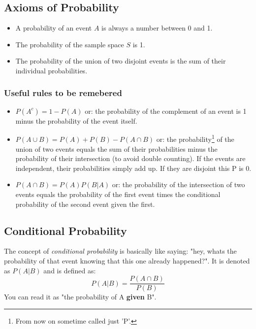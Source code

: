 \documentclass[a4paper]{article}
\begin{document}
\subsection{Axioms of Probability}
\begin{itemize}
    \item A probability of an event \(A\) is always a number between 0 and 1.
    \item The probability of the sample space \(S\) is 1.
    \item The probability of the union of two disjoint events is the sum of their individual probabilities.
\end{itemize}

\subsubsection{Useful rules to be remebered}
\begin{itemize}
    \item \( P(A^c) = 1 - P(A) \) or: the probability of the complement of an event is 1 minus the probability of the event itself.
    \item \( P(A \cup B) = P(A) + P(B) - P(A \cap B) \) or: the probability\footnote{From now on sometime called just 'P'.} of the union of two events equals the sum of their probabilities minus the probability of their intersection (to avoid double counting). If the events are independent, their probabilities simply add up. If they are disjoint this P is 0.
    \item \( P(A \cap B) = P(A)P(B|A) \) or: the probability of the intersection of two events equals the probability of the first event times the conditional probability of the second event given the first.
\end{itemize}

\subsection{Conditional Probability}
The concept of \textit{conditional probability} is basically like saying: "hey, whats the probability of that event knowing that this one already happened?". It is denoted as \( P(A|B) \) and is defined as:
\[ P(A|B) = \frac{P(A \cap B)}{P(B)} \]
You can read it as "the probability of A \textbf{given} B".
\end{document}
